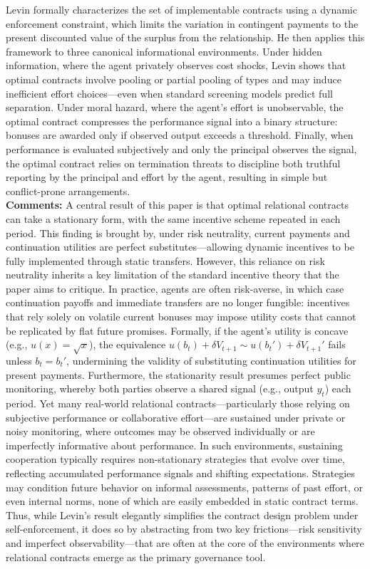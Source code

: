 \documentclass[10pt]{article}    %
\begin{document}
Levin formally characterizes the set of implementable contracts using a dynamic enforcement constraint, which limits the variation in contingent payments to the present discounted value of the surplus from the relationship. He then applies this framework to three canonical informational environments. Under hidden information, where the agent privately observes cost shocks, Levin shows that optimal contracts involve pooling or partial pooling of types and may induce inefficient effort choices—even when standard screening models predict full separation. Under moral hazard, where the agent’s effort is unobservable, the optimal contract compresses the performance signal into a binary structure: bonuses are awarded only if observed output exceeds a threshold. Finally, when performance is evaluated subjectively and only the principal observes the signal, the optimal contract relies on termination threats to discipline both truthful reporting by the principal and effort by the agent, resulting in simple but conflict-prone arrangements.
\\
\textbf{Comments:} A central result of this paper is that optimal relational contracts can take a stationary form, with the same incentive scheme repeated in each period. This finding is brought by, under risk neutrality, current payments and continuation utilities are perfect substitutes—allowing dynamic incentives to be fully implemented through static transfers. However, this reliance on risk neutrality inherits a key limitation of the standard incentive theory that the paper aims to critique. In practice, agents are often risk-averse, in which case continuation payoffs and immediate transfers are no longer fungible: incentives that rely solely on volatile current bonuses may impose utility costs that cannot be replicated by flat future promises. Formally, if the agent’s utility is concave (e.g., $u(x) = \sqrt{x}$), the equivalence $u(b_t) + \delta V_{t+1} \sim u(b_t') + \delta V_{t+1}'$ fails unless $b_t = b_t'$, undermining the validity of substituting continuation utilities for present payments. Furthermore, the stationarity result presumes perfect public monitoring, whereby both parties observe a shared signal (e.g., output $y_t$) each period. Yet many real-world relational contracts—particularly those relying on subjective performance or collaborative effort—are sustained under private or noisy monitoring, where outcomes may be observed individually or are imperfectly informative about performance. In such environments, sustaining cooperation typically requires non-stationary strategies that evolve over time, reflecting accumulated performance signals and shifting expectations. Strategies may condition future behavior on informal assessments, patterns of past effort, or even internal norms, none of which are easily embedded in static contract terms. Thus, while Levin’s result elegantly simplifies the contract design problem under self-enforcement, it does so by abstracting from two key frictions—risk sensitivity and imperfect observability—that are often at the core of the environments where relational contracts emerge as the primary governance tool.
\end{document}
